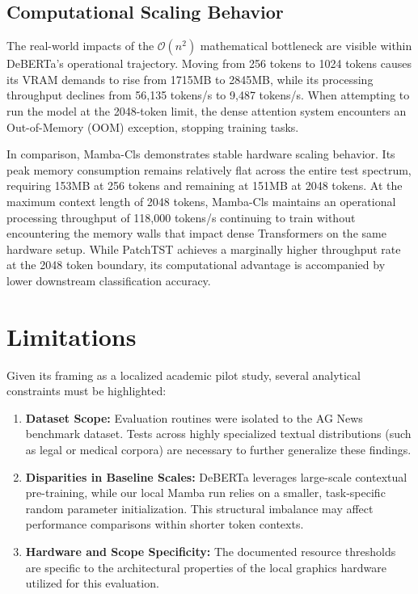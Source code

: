 \documentclass[runningheads]{llncs}
\begin{document}
\subsection{Computational Scaling Behavior}
The real-world impacts of the $\mathcal{O}(n^2)$ mathematical bottleneck are visible within DeBERTa's operational trajectory. Moving from 256 tokens to 1024 tokens causes its VRAM demands to rise from 1715MB to 2845MB, while its processing throughput declines from 56,135 tokens/s to 9,487 tokens/s. When attempting to run the model at the 2048-token limit, the dense attention system encounters an Out-of-Memory (OOM) exception, stopping training tasks.

In comparison, Mamba-Cls demonstrates stable hardware scaling behavior. Its peak memory consumption remains relatively flat across the entire test spectrum, requiring 153MB at 256 tokens and remaining at 151MB at 2048 tokens. At the maximum context length of 2048 tokens, Mamba-Cls maintains an operational processing throughput of 118,000 tokens/s continuing to train without encountering the memory walls that impact dense Transformers on the same hardware setup. While PatchTST achieves a marginally higher throughput rate at the 2048 token boundary, its computational advantage is accompanied by lower downstream classification accuracy.

\section{Limitations}
Given its framing as a localized academic pilot study, several analytical constraints must be highlighted:
\begin{enumerate}
    \item \textbf{Dataset Scope:} Evaluation routines were isolated to the AG News benchmark dataset. Tests across highly specialized textual distributions (such as legal or medical corpora) are necessary to further generalize these findings.
    \item \textbf{Disparities in Baseline Scales:} DeBERTa leverages large-scale contextual pre-training, while our local Mamba run relies on a smaller, task-specific random parameter initialization. This structural imbalance may affect performance comparisons within shorter token contexts.
    \item \textbf{Hardware and Scope Specificity:} The documented resource thresholds are specific to the architectural properties of the local graphics hardware utilized for this evaluation.
\end{enumerate}
\end{document}

